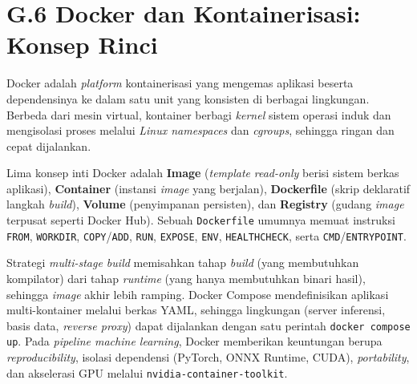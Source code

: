 \section*{G.6 Docker dan Kontainerisasi: Konsep Rinci}
\label{app:docker-detail}

Docker \citep{merkelDocker2014} adalah \textit{platform} kontainerisasi yang mengemas aplikasi beserta dependensinya ke dalam satu unit yang konsisten di berbagai lingkungan. Berbeda dari mesin virtual, kontainer berbagi \textit{kernel} sistem operasi induk dan mengisolasi proses melalui \textit{Linux namespaces} dan \textit{cgroups}, sehingga ringan dan cepat dijalankan.

Lima konsep inti Docker adalah \textbf{Image} (\textit{template} \textit{read-only} berisi sistem berkas aplikasi), \textbf{Container} (instansi \textit{image} yang berjalan), \textbf{Dockerfile} (skrip deklaratif langkah \textit{build}), \textbf{Volume} (penyimpanan persisten), dan \textbf{Registry} (gudang \textit{image} terpusat seperti Docker Hub). Sebuah \texttt{Dockerfile} umumnya memuat instruksi \texttt{FROM}, \texttt{WORKDIR}, \texttt{COPY}/\texttt{ADD}, \texttt{RUN}, \texttt{EXPOSE}, \texttt{ENV}, \texttt{HEALTHCHECK}, serta \texttt{CMD}/\texttt{ENTRYPOINT}.

Strategi \textit{multi-stage build} memisahkan tahap \textit{build} (yang membutuhkan kompilator) dari tahap \textit{runtime} (yang hanya membutuhkan binari hasil), sehingga \textit{image} akhir lebih ramping. Docker Compose mendefinisikan aplikasi multi-kontainer melalui berkas YAML, sehingga lingkungan (server inferensi, basis data, \textit{reverse proxy}) dapat dijalankan dengan satu perintah \texttt{docker compose up}. Pada \textit{pipeline machine learning}, Docker memberikan keuntungan berupa \textit{reproducibility}, isolasi dependensi (PyTorch, ONNX Runtime, CUDA), \textit{portability}, dan akselerasi GPU melalui \texttt{nvidia-container-toolkit}.
